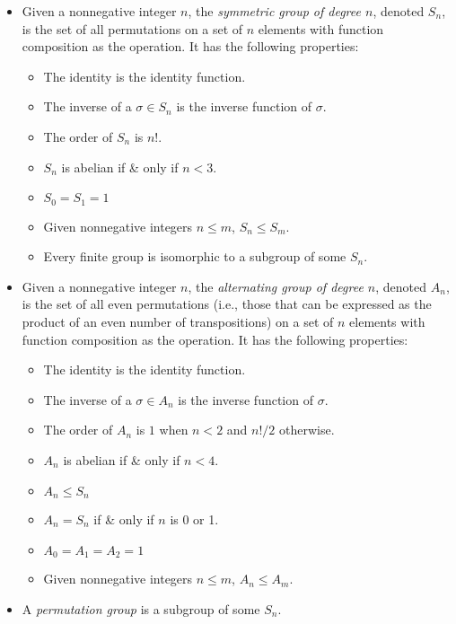 \documentclass{article}
\begin{document}
\begin{itemize}
\item Given a nonnegative integer $n$, the \emph{symmetric group of degree $n$}, denoted $S_n$, is the set of all permutations on a set of $n$ elements with function composition as the operation.  It has the following properties:
 \begin{itemize}
 \item The identity is the identity function.
 \item The inverse of a $\sigma\in S_n$ is the inverse function of $\sigma$.
 \item The order of $S_n$ is $n!$.
 \item $S_n$ is abelian if \& only if $n<3$.
 \item $S_0 = S_1 = 1$
 \item Given nonnegative integers $n\leq m$, $S_n \leq S_m$.
 \item Every finite group is isomorphic to a subgroup of some $S_n$.
 \end{itemize}
\item Given a nonnegative integer $n$, the \emph{alternating group of degree $n$}, denoted $A_n$, is the set of all even permutations (i.e., those that can be expressed as the product of an even number of transpositions) on a set of $n$ elements with function composition as the operation.  It has the following properties:
 \begin{itemize}
 \item The identity is the identity function.
 \item The inverse of a $\sigma\in A_n$ is the inverse function of $\sigma$.
 \item The order of $A_n$ is $1$ when $n<2$ and $n!/2$ otherwise.
 \item $A_n$ is abelian if \& only if $n<4$.
 \item $A_n \leq S_n$
 \item $A_n = S_n$ if \& only if $n$ is 0 or 1.
 \item $A_0 = A_1 = A_2 = 1$
 \item Given nonnegative integers $n\leq m$, $A_n \leq A_m$.
 \end{itemize}
\item A \emph{permutation group} is a subgroup of some $S_n$.


\end{itemize}
\end{document}
